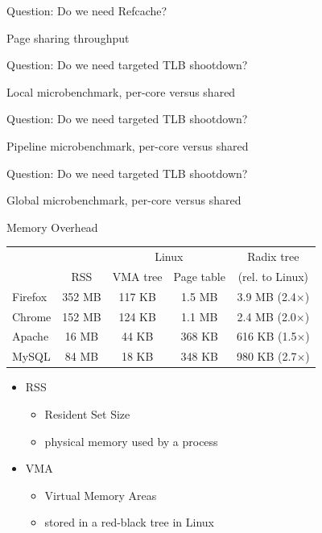 \documentclass[aspectratio=169]{beamer}
\newcommand{\bi}{\begin{itemize}}
\newcommand{\ei}{\end{itemize}}
\begin{document}
\begin{frame}{Question: Do we need Refcache?}
  \begin{center}
    Page sharing throughput\\
    
  \end{center}
\end{frame}

\begin{frame}{Question: Do we need targeted TLB shootdown?}
  \begin{center}
    Local microbenchmark, per-core versus shared\\
    
  \end{center}
\end{frame}

\begin{frame}{Question: Do we need targeted TLB shootdown?}
  \begin{center}
    Pipeline microbenchmark, per-core versus shared\\
    
  \end{center}
\end{frame}

\begin{frame}{Question: Do we need targeted TLB shootdown?}
  \begin{center}
    Global microbenchmark, per-core versus shared\\
    
  \end{center}
\end{frame}

\begin{frame}{Memory Overhead}
  \begin{center}
    \begin{tabular}{ l | c | c c | c }
              &        & \multicolumn{2}{c|}{Linux} & Radix tree \\
              & RSS    & VMA tree & Page table      & (rel. to Linux) \\
      \hline
      Firefox & 352 MB & 117 KB   & 1.5 MB          & 3.9 MB (2.4$\times$) \\
      Chrome  & 152 MB & 124 KB   & 1.1 MB          & 2.4 MB (2.0$\times$) \\
      Apache  & 16 MB  & 44 KB    & 368 KB          & 616 KB (1.5$\times$) \\
      MySQL   & 84 MB  & 18 KB    & 348 KB          & 980 KB (2.7$\times$) \\
    \end{tabular}
    \vspace{1em}
    \bi
  \item RSS
    \bi
  \item Resident Set Size
  \item physical memory used by a process
    \ei
  \item VMA
    \bi
  \item Virtual Memory Areas
  \item stored in a red-black tree in Linux
    \ei
    \ei
  \end{center}
\end{frame}
\end{document}
